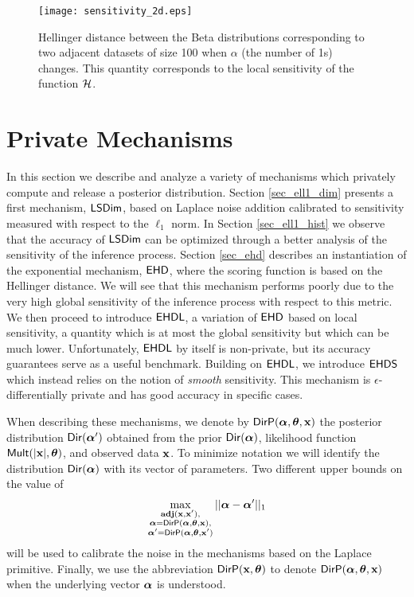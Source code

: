 \documentclass{article}
\begin{document}
\begin{figure}[ht]
\centering
\texttt{[image: sensitivity\_2d.eps]}
\caption{Hellinger distance between the Beta distributions
  corresponding to two adjacent datasets of size 100
  when  $\alpha$ (the number of 1s) changes. This quantity corresponds
  to the local sensitivity of the function $\mathcal{H}$.}
\label{fig_sensitivity}
\end{figure}



\section{Private Mechanisms}
\label{sec_mechs}
In this section we describe and analyze a variety of mechanisms which privately compute and release
a posterior distribution.
Section \ref{sec_ell1_dim} presents a first mechanism, $\mathsf{LSDim}$,
based on Laplace noise addition calibrated to sensitivity measured with respect to the $\ell_1$ norm.
In Section \ref{sec_ell1_hist} we observe that the accuracy of $\mathsf{LSDim}$ can be optimized
through a better analysis of the sensitivity of the inference process.
Section \ref{sec_ehd} describes an instantiation of the exponential mechanism, $\mathsf{EHD}$, where the scoring
function is based on the Hellinger distance. We will see that this mechanism performs
poorly due to the very high global sensitivity of the inference process with respect to this metric.
We then proceed to introduce $\mathsf{EHDL}$, a variation of $\mathsf{EHD}$ based on local sensitivity,
a quantity which is at most the global sensitivity but which can be much lower.
Unfortunately, $\mathsf{EHDL}$ by itself is non-private, but its accuracy guarantees serve as a useful benchmark.
Building on $\mathsf{EHDL}$, we introduce $\mathsf{EHDS}$
which instead relies on the notion of  \emph{smooth} sensitivity. This mechanism is $\epsilon$-differentially private and
has good accuracy in specific cases.

When describing these mechanisms, we denote by $\mathsf{DirP}(\boldsymbol{\alpha},\boldsymbol{\theta},\textbf{x})$ the posterior  distribution $\mathsf{Dir}(\boldsymbol{\alpha}')$
obtained from the prior $\mathsf{Dir}(\boldsymbol{\alpha})$, likelihood function $\mathsf{Mult}(|\textbf{x}|, \boldsymbol{\theta})$, and observed data $\textbf{x}$.
To minimize notation we will identify the distribution $\mathsf{Dir}(\boldsymbol{\alpha})$ with its vector
of parameters.
Two different upper bounds on the value of
\begin{align}
  \label{eqn:eq1}
  \max_{\substack{\textbf{adj}(\textbf{x},\textbf{x}'),\\
      \boldsymbol{\alpha}=\mathsf{DirP}(\boldsymbol{\alpha},\boldsymbol{\theta},\textbf{x}),\\
      \boldsymbol{\alpha}'=\mathsf{DirP}(\boldsymbol{\alpha},\boldsymbol{\theta},\textbf{x}')}}||\boldsymbol{\alpha}-\boldsymbol{\alpha}'||_1 
\end{align}
will be used to calibrate the noise in the mechanisms based on the Laplace primitive.
Finally, we use the abbreviation $\mathsf{DirP}(\textbf{x},\boldsymbol{\theta})$ to denote $\mathsf{DirP}(\boldsymbol{\alpha},\boldsymbol{\theta},\textbf{x})$ when the underlying vector $\boldsymbol{\alpha}$
is understood.
\end{document}
